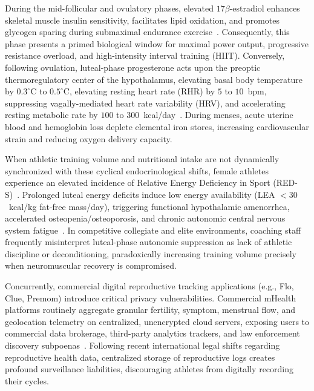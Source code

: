 \documentclass[conference]{IEEEtran}
\begin{document}
During the mid-follicular and ovulatory phases, elevated $17\beta$-estradiol enhances skeletal muscle insulin sensitivity, facilitates lipid oxidation, and promotes glycogen sparing during submaximal endurance exercise~\cite{sims2021}. Consequently, this phase presents a primed biological window for maximal power output, progressive resistance overload, and high-intensity interval training (HIIT). Conversely, following ovulation, luteal-phase progesterone acts upon the preoptic thermoregulatory center of the hypothalamus, elevating basal body temperature by $0.3^\circ$C to $0.5^\circ$C, elevating resting heart rate (RHR) by $5$ to $10$~bpm, suppressing vagally-mediated heart rate variability (HRV), and accelerating resting metabolic rate by $100$ to $300$~kcal/day~\cite{barr1995}. During menses, acute uterine blood and hemoglobin loss deplete elemental iron stores, increasing cardiovascular strain and reducing oxygen delivery capacity.

When athletic training volume and nutritional intake are not dynamically synchronized with these cyclical endocrinological shifts, female athletes experience an elevated incidence of Relative Energy Deficiency in Sport (RED-S)~\cite{mountjoy2018}. Prolonged luteal energy deficits induce low energy availability (LEA $< 30$~kcal/kg fat-free mass/day), triggering functional hypothalamic amenorrhea, accelerated osteopenia/osteoporosis, and chronic autonomic central nervous system fatigue~\cite{mountjoy2018}. In competitive collegiate and elite environments, coaching staff frequently misinterpret luteal-phase autonomic suppression as lack of athletic discipline or deconditioning, paradoxically increasing training volume precisely when neuromuscular recovery is compromised.

Concurrently, commercial digital reproductive tracking applications (e.g., Flo, Clue, Premom) introduce critical privacy vulnerabilities. Commercial mHealth platforms routinely aggregate granular fertility, symptom, menstrual flow, and geolocation telemetry on centralized, unencrypted cloud servers, exposing users to commercial data brokerage, third-party analytics trackers, and law enforcement discovery subpoenas~\cite{mozilla2023}. Following recent international legal shifts regarding reproductive health data, centralized storage of reproductive logs creates profound surveillance liabilities, discouraging athletes from digitally recording their cycles.
\end{document}
